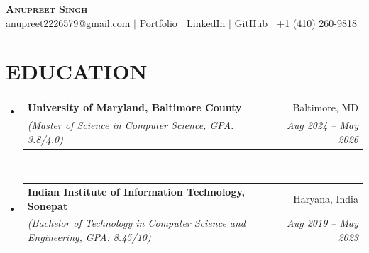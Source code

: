 \documentclass[letterpaper,11pt]{article}
\makeatletter
\newcommand{\SectionListBegin}{\begin{itemize}[leftmargin=0.15in, label={}]}
\newcommand{\SectionListEnd}{\end{itemize}}
\newcommand{\DLSubheadingItem}[4]{
  \vspace{-2pt}\item
    \begin{tabular*}{0.97\textwidth}[t]{l@{\extracolsep{\fill}}r}
      \textbf{#1} & {\small #2} \\
      \textit{\small#3} & \textit{\small #4} \\
    \end{tabular*}\vspace{-7pt}
}
\makeatother
\begin{document}
\begin{center}
	{\textbf{\Huge \scshape Anupreet Singh}} \\ \vspace{1pt}
	\small  \href{mailto:anupreet2226579@gmail.com}{\underline{anupreet2226579@gmail.com}} 
	  $|$ 
	\small {\href{https://portfolio-omega-three-hw8q4rw3hx.vercel.app}{\underline{Portfolio}}}
    $|$ 
	\small {\href{https://www.linkedin.com/in/anupreet-singh-71b1861b8/}{\underline{LinkedIn}}}
    $|$ 
	\small {\href{https://github.com/anupreetsingh}{\underline{GitHub}}}
    $|$ 
{\underline{+1 (410) 260-9818}} 
\end{center}


\section{EDUCATION}
  \SectionListBegin
    \DLSubheadingItem
      {University of Maryland, Baltimore County}{Baltimore, MD}
      {(Master of Science in Computer Science, GPA: 3.8/4.0)}{Aug 2024 -- May 2026}\\
    {\vspace{2mm}}
    \DLSubheadingItem
      {Indian Institute of Information Technology, Sonepat}{Haryana, India}
      {(Bachelor of Technology in Computer Science and Engineering, GPA: 8.45/10)}{Aug 2019 -- May 2023} \\
  \SectionListEnd
  

\end{document}
